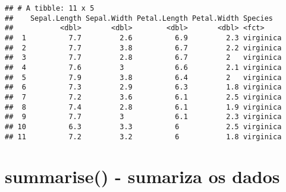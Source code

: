 \documentclass[]{book}
\newenvironment{Shaded}{\begin{snugshade}}{\end{snugshade}}
\newcommand{\DataTypeTok}[1]{\textcolor[rgb]{0.13,0.29,0.53}{#1}}
\newcommand{\DecValTok}[1]{\textcolor[rgb]{0.00,0.00,0.81}{#1}}
\newcommand{\KeywordTok}[1]{\textcolor[rgb]{0.13,0.29,0.53}{\textbf{#1}}}
\newcommand{\NormalTok}[1]{#1}
\newcommand{\OperatorTok}[1]{\textcolor[rgb]{0.81,0.36,0.00}{\textbf{#1}}}
\newcommand{\StringTok}[1]{\textcolor[rgb]{0.31,0.60,0.02}{#1}}
\begin{document}
\begin{Shaded}
\end{Shaded}

\begin{verbatim}
## # A tibble: 11 x 5
##    Sepal.Length Sepal.Width Petal.Length Petal.Width Species  
##           <dbl>       <dbl>        <dbl>       <dbl> <fct>    
##  1          7.7         2.6          6.9         2.3 virginica
##  2          7.7         3.8          6.7         2.2 virginica
##  3          7.7         2.8          6.7         2   virginica
##  4          7.6         3            6.6         2.1 virginica
##  5          7.9         3.8          6.4         2   virginica
##  6          7.3         2.9          6.3         1.8 virginica
##  7          7.2         3.6          6.1         2.5 virginica
##  8          7.4         2.8          6.1         1.9 virginica
##  9          7.7         3            6.1         2.3 virginica
## 10          6.3         3.3          6           2.5 virginica
## 11          7.2         3.2          6           1.8 virginica
\end{verbatim}

\hypertarget{summarise---sumariza-os-dados}{%
\section{summarise() - sumariza os dados}\label{summarise---sumariza-os-dados}}

\begin{Shaded}
\end{Shaded}
\end{document}
